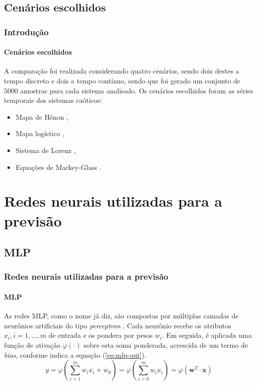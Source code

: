 \documentclass[aspectratio=169]{beamer}
\begin{document}
\subsection{Cenários escolhidos}

\begin{frame}
    \frametitle{Introdução}
    \framesubtitle{Cenários escolhidos}
    \justifying A comparação foi realizada considerando quatro cenários, sendo dois destes a tempo discreto e dois a tempo contínuo, sendo que foi gerado um conjunto de $5000$ amostras para cada sistema analisado. Os cenários escolhidos foram as séries temporais dos sistemas caóticos:

    \begin{itemize}[<+-| alert@+>]    
    \item Mapa de Hénon \cite{henon1976two},
    \item Mapa logístico \cite{may1976simple},
    \item Sistema de Lorenz \cite{lorenz1963deterministic},
    \item Equações de Mackey-Glass \cite{mackey1977oscillation}.
    \end{itemize}
\end{frame}

\section{Redes neurais utilizadas para a previsão}

\subsection{MLP}

\begin{frame}
\frametitle{Redes neurais utilizadas para a previsão}
\framesubtitle{MLP}
\justifying As redes MLP, como o nome já diz, são compostas por múltiplas camadas de neurônios artificiais do tipo \textit{perceptron}  \cite{rosenblatt1958perceptron}. Cada neurônio recebe os atributos $x_i, i = 1, \ldots, m$ de entrada e os pondera por pesos $w_i$. Em seguida, é aplicada uma função de ativação $\varphi(\cdot)$ sobre esta soma ponderada, acrescida de um termo de \textit{bias}, conforme indica a equação (\ref{eq:mlp-out}).
\begin{equation}\label{eq:mlp-out}
y = \varphi  \left(\sum_{i=1}^{m}w_i x_i + w_0 \right) = \varphi \left(\sum_{i=0}^{m}w_i x_i \right) = \varphi \left(\mathbf{w}^T \cdot \mathbf{x} \right)
\end{equation}
\end{frame}
\end{document}
